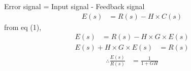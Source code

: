 \documentclass[journal,12pt,twocolumn]{IEEEtran}
\begin{document}
	 Error signal = Input signal - Feedback signal 
	\begin{align}
	      E(s) &= R(s) - H \times C(s)
	\end{align}
	from eq (1),     
	\begin{align}
		E(s) &= R(s) - H \times G \times E(s)
	\end{align}
	\begin{align}
		E(s) +  H \times G \times E(s) &= R(s)
		\end{align}
		\begin{align}
					\therefore \frac{E(s)}{R(s)} &= \frac{1}{1 + GH}
	\end{align} 
	
	
	
	
\end{document}
